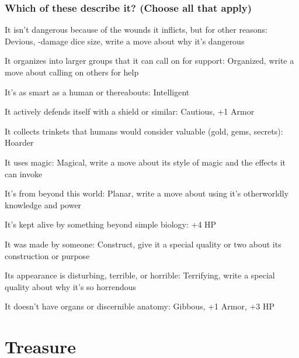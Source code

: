 \stopitemize
 
\subsubsection{Which of these describe it? (Choose all that apply)}     
 
\startitemize[1,packed]

\item It isn't dangerous because of the wounds it inflicts, but for other reasons: Devious, -damage dice size, write a move about why it's dangerous

 
\item It organizes into larger groups that it can call on for support: Organized, write a move about calling on others for help

 
\item It's as smart as a human or thereabouts: Intelligent

 
\item It actively defends itself with a shield or similar: Cautious, +1 Armor

 
\item It collects trinkets that humans would consider valuable (gold, gems, secrets): Hoarder

 
\item It uses magic: Magical, write a move about its style of magic and the effects it can invoke

 
\item It's from beyond this world: Planar, write a move about using it's otherworldly knowledge and power

 
\item It's kept alive by something beyond simple biology: +4 HP

 
\item It was made by someone: Construct, give it a special quality or two about its construction or purpose

 
\item Its appearance is disturbing, terrible, or horrible: Terrifying, write a special quality about why it's so horrendous

 
\item It doesn't have organs or discernible anatomy: Gibbous, +1 Armor, +3 HP


\stopitemize
 
\section{Treasure}   
 


